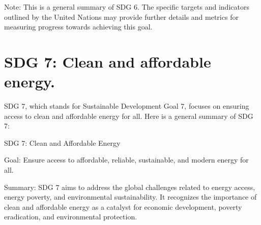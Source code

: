 \documentclass{article}
\begin{document}
Note: This is a general summary of SDG 6. The specific targets and indicators outlined by the United Nations may provide further details and metrics for measuring progress towards achieving this goal.

\section*{SDG 7: Clean and affordable energy.}
SDG 7, which stands for Sustainable Development Goal 7, focuses on ensuring access to clean and affordable energy for all. Here is a general summary of SDG 7:

SDG 7: Clean and Affordable Energy

Goal: Ensure access to affordable, reliable, sustainable, and modern energy for all.

Summary:
SDG 7 aims to address the global challenges related to energy access, energy poverty, and environmental sustainability. It recognizes the importance of clean and affordable energy as a catalyst for economic development, poverty eradication, and environmental protection.
\end{document}

